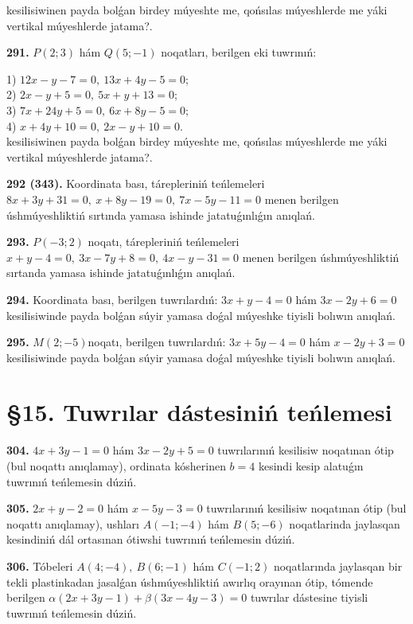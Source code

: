\documentclass{article}
\begin{document}
kesilisiwinen payda bolǵan birdey múyeshte me, qońsılas múyeshlerde me yáki vertikal
múyeshlerde jatama?.

\textbf{291.} \(P(2;3)\) hám \(Q(5;-1)\) noqatları, berilgen eki
tuwrınıń:

1) $12x-y-7=0,\ 13x+4y-5=0$; \\
2) $2x-y+5=0,\ 5x+y+13=0$; \\
3) $7x+24y+5=0,\ 6x+8y-5=0;$  \\
4) $x+4y+10=0,\ 2x-y+10=0$. \\

kesilisiwinen payda bolǵan birdey múyeshte me, qońsılas múyeshlerde me yáki vertikal
múyeshlerde jatama?.

\textbf{292 (343).} Koordinata bası, tárepleriniń teńlemeleri
\(8x+3y+31=0,\ x+8y-19=0,\ 7x-5y-11=0\) menen
berilgen úshmúyeshliktiń sırtında yamasa ishinde jatatuǵınlıǵın anıqlań.

\textbf{293.} \(P(-3;2)\) noqatı, tárepleriniń teńlemeleri
\(x+y-4=0,\ 3x-7y+8=0,\ 4x-y-31=0\) menen
berilgen úshmúyeshliktiń sırtanda yamasa ishinde jatatuǵınlıǵın anıqlań.

\textbf{294.} Koordinata bası, berilgen tuwrılardıń:
\(3x+y-4=0\) hám \(3x-2y+6=0\) kesilisiwinde payda
bolǵan súyir yamasa doǵal múyeshke tiyisli bolıwın anıqlań.

\textbf{295.} \(M(2;-5)\)noqatı, berilgen tuwrılardıń:
\(3x+5y-4=0\) hám \(x-2y+3=0\) kesilisiwinde payda
bolǵan súyir yamasa doǵal múyeshke tiyisli bolıwın anıqlań.

\section*{\S 15. Tuwrılar dástesiniń teńlemesi}

\textbf{304.} \(4x+3y-1=0\) hám \(3x-2y+5=0\)
tuwrılarınıń kesilisiw noqatınan ótip (bul noqattı anıqlamay), ordinata
kósherinen \(b=4\) kesindi kesip alatuǵın tuwrınıń teńlemesin dúziń.

\textbf{305.} \(2x+y-2=0\) hám \(x-5y-3=0\)
tuwrılarınıń kesilisiw noqatınan ótip (bul noqattı anıqlamay), ushları
\(A(-1;-4)\) hám \(B(5;-6)\) noqatlarinda jaylasqan kesindiniń
dál ortasınan ótiwshi tuwrınıń teńlemesin dúziń.

\textbf{306.} Tóbeleri \(A(4;-4),\ B(6;-1)\) hám \(C(-1;2)\)
noqatlarında jaylasqan bir tekli plastinkadan jasalǵan úshmúyeshliktiń
awırlıq orayınan ótip, tómende berilgen
\(\alpha(2x+3y-1)+\beta(3x-4y-3)=0\) tuwrılar dástesine
tiyisli tuwrınıń teńlemesin dúziń.
\end{document}
